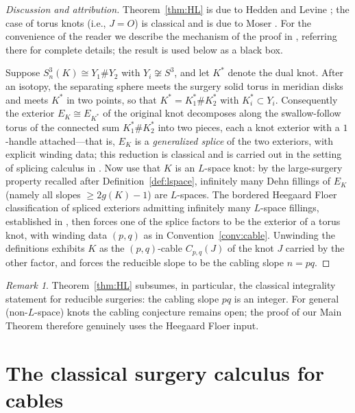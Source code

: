 \documentclass[11pt]{article}
\theoremstyle{definition}
\theoremstyle{remark}
\newtheorem{remark}[theorem]{Remark}
\numberwithin{equation}{section}
\begin{document}
\begin{proof}[Discussion and attribution]
Theorem~\ref{thm:HL} is due to Hedden and Levine \cite{HL16}; the case of
torus knots (i.e., $J=O$) is classical and is due to Moser
\cite{Mos71}.  For the convenience of the reader we describe the
mechanism of the proof in \cite{HL16}, referring there for complete
details; the result is used below as a black box.

Suppose $S^{3}_{n}(K)\cong Y_{1}\#Y_{2}$ with
$Y_{i}\not\cong S^{3}$, and let $K^{*}$ denote the dual knot.  After an
isotopy, the separating sphere meets the surgery solid torus in
meridian disks and meets $K^{*}$ in two points, so that
$K^{*}=K^{*}_{1}\#K^{*}_{2}$ with $K^{*}_{i}\subset Y_{i}$.  Consequently
the exterior $E_{K}\cong E_{K^{*}}$ of the original knot decomposes along
the swallow-follow torus of the connected sum $K^{*}_{1}\#K^{*}_{2}$ into
two pieces, each a knot exterior with a $1$-handle attached---that is,
$E_{K}$ is a \emph{generalized splice} of the two exteriors, with
explicit winding data; this reduction is classical and is carried out in
the setting of splicing calculus in \cite{EN85}.  Now use that $K$ is an
$L$-space knot: by the large-surgery property recalled after
Definition~\ref{def:lspace}, infinitely many Dehn fillings of $E_{K}$
(namely all slopes $\ge 2g(K)-1$) are $L$-spaces.  The bordered Heegaard
Floer classification of spliced exteriors admitting infinitely many
$L$-space fillings, established in \cite{HL16}, then forces one of the
splice factors to be the exterior of a torus knot, with winding data
$(p,q)$ as in Convention~\ref{conv:cable}.  Unwinding the definitions
exhibits $K$ as the $(p,q)$-cable $C_{p,q}(J)$ of the knot $J$ carried by
the other factor, and forces the reducible slope to be the cabling slope
$n=pq$.
\end{proof}

\begin{remark}
Theorem~\ref{thm:HL} subsumes, in particular, the classical integrality
statement for reducible surgeries: the cabling slope $pq$ is an integer.
For general (non-$L$-space) knots the cabling conjecture remains open; the
proof of our Main Theorem therefore genuinely uses the Heegaard Floer
input.
\end{remark}

\section{The classical surgery calculus for cables}\label{sec:cables}
\end{document}
